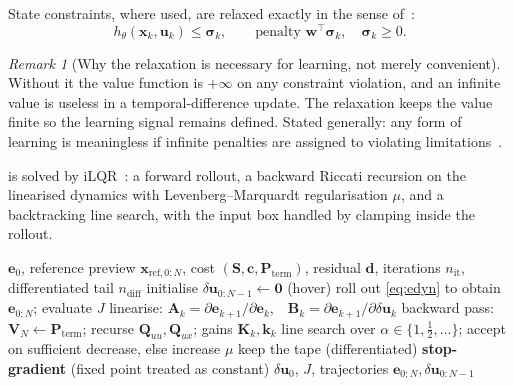 \documentclass[11pt,a4paper,twoside,openright]{report}
\makeatletter
\renewcommand{\subsection}{\FloatBarrier\old@subsection}}
\newcommand{\transp}{^{\!\top}}
\renewcommand{\vec}[1]{\bm{#1}}
\newcommand{\mat}[1]{\bm{#1}}
\newcommand{\ctrlstate}{\vec{x}}
\newcommand{\inp}{\vec{u}}
\newcommand{\err}{\vec{e}}
\newcommand{\dres}{\vec{d}}
\newcommand{\refsym}{\mathrm{ref}}
\theoremstyle{plain}
\theoremstyle{definition}
\theoremstyle{remark}
\newtheorem{remark}[theorem]{Remark}
\makeatother
\begin{document}
	State constraints, where used, are relaxed exactly in the sense
	of~\cite{scokaert1999feasibility}:
	\begin{equation}
		h_\theta(\ctrlstate_k,\inp_k)\le\vec\sigma_k,\qquad
		\text{penalty } \vec w\transp\vec\sigma_k,\quad \vec\sigma_k\ge0 .
		\label{eq:l1relax}
	\end{equation}

	\begin{remark}[Why the relaxation is necessary for learning, not merely convenient]
		Without it the value function is $+\infty$ on any constraint violation, and an
		infinite value is useless in a temporal-difference update. The relaxation keeps
		the value finite so the learning signal remains defined. Stated generally: any
		form of learning is meaningless if infinite penalties are assigned to violating
		limitations~\cite{gros2020data}.
	\end{remark}

	\subsection{iLQR and differentiation}

	 is solved by iLQR~\cite{li2004ilqr,tassa2012synthesis}: a forward
	rollout, a backward Riccati recursion on the linearised dynamics with
	Levenberg--Marquardt regularisation $\mu$, and a backtracking line search, with
	the input box handled by clamping inside the rollout.

	\begin{algorithm}[htbp]
		\caption{iLQR solve used as a differentiable layer}
		\label{alg:ilqr}
		\begin{algorithmic}[1]
			\Require $\err_0$, reference preview $\ctrlstate_{\refsym,0:N}$, cost
			$(\mat S,\vec c,\mat P_\mathrm{term})$, residual $\dres$, iterations $n_\mathrm{it}$,
			differentiated tail $n_\mathrm{diff}$
			\State initialise $\delta\inp_{0:N-1}\gets \vec 0$ (hover)
			\State roll out \cref{eq:edyn} to obtain $\err_{0:N}$; evaluate $J$
			\State linearise: $\mat A_k=\partial\err_{k+1}/\partial\err_k$,\ \
			$\mat B_k=\partial\err_{k+1}/\partial\delta\inp_k$
			\State backward pass: $\mat V_N\gets\mat P_\mathrm{term}$; recurse
			$\mat Q_{uu},\mat Q_{ux}$; gains $\mat K_k,\vec k_k$
			\State line search over $\alpha\in\{1,\tfrac12,\dots\}$; accept on sufficient
			decrease, else increase $\mu$
			 \State keep the tape (differentiated)
			\Else \State \textbf{stop-gradient} (fixed point treated as constant)
			\EndIf
			\EndFor
			\State \Return $\delta\inp_0$, $J$, trajectories $\err_{0:N},\delta\inp_{0:N-1}$
		\end{algorithmic}
	\end{algorithm}
\end{document}
